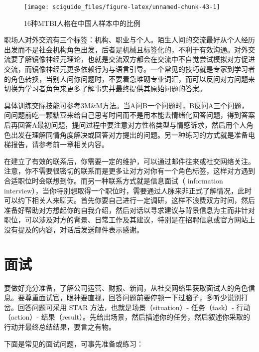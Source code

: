 \documentclass[]{tufte-book}
\begin{document}
\begin{figure}
\texttt{[image: sciguide\_files/figure-latex/unnamed-chunk-43-1]} \caption[16种MTBI人格在中国人样本中的比例]{16种MTBI人格在中国人样本中的比例}\label{fig:unnamed-chunk-43}
\end{figure}

职场人对外交流有三个标签：机构、职业与个人。陌生人间的交流最好从个人经历出发而不是社会机构角色出发，后者是机械且标签化的，不利于有效沟通。对外交流要了解镜像神经元理论，也就是交流双方都会在交流中不自觉尝试模拟对方促进交流，而镜像神经元更多依赖行为与语言引导。一个常见的技巧就是专家到学习者的角色转换，当别人问你问题时，不要着急堆砌专业词汇，而可以反问对方问题来切换为学习者角色来更多了解事实并最终提供其原始问题的答案。

具体训练交际技能可参考3M\&M方法。当A问B一个问题时，B反问A三个问题，问问题前吃一颗糖豆来给自己思考时间而不是用本能去情绪化回答问题，得到答案后再回答A最初问题，提问过程中要注意对方性格类型与情感诉求，然后用个人角色出发在理解同情角度解决或回答对方提出的问题。另一种练习的方式就是准备电梯报告，请参考前一章相关内容。

在建立了有效的联系后，你需要一定的维护，可以通过邮件往来或社交网络关注。注意，你不需要很密切的联系而是更多让对方对你有一个角色标签，这样对方遇到合适职位时会联想到你。而另一种联系方式就是信息面试（ information interview），当你特别想取得一个职位时，需要通过人脉来非正式了解情况，此时可以约下相关人来聊天。首先你要自己进行一定调研，这样不浪费双方时间，然后准备好帮助对方想起你的自我介绍，然后对话以寻求建议与背景信息为主而非针对职位，可以涉及对方的背景、日常工作及其建议，特别是在招聘信息或官方网站上没有提及的内容，对话后发送邮件表示感谢。

\hypertarget{ux9762ux8bd5}{%
\section{面试}\label{ux9762ux8bd5}}

要做好充分准备，了解公司运营、财报、新闻，从社交网络里获取面试人的角色信息。要尊重面试官，眼神要直视，回答问题前要停顿一下过脑子，多听少说别打岔。回答问题可采用 STAR 方法，也就是场景（situation）- 任务（task）- 行动（action）- 结果（result）。先给出场景，然后描述你的任务，然后叙述你采取的行动并最终总结结果，要言之有物。

下面是常见的面试问题，可事先准备或练习：
\end{document}
